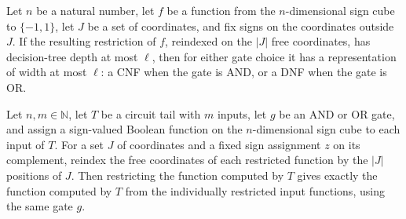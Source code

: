 \begin{theorem}
\label{FABL.CircuitGate.hasWidthLE_reindexedSignRestriction_of_depth_le}
\leanok
{}
Let $n$ be a natural number, let $f$ be a function from the $n$-dimensional sign cube to
$\{−1,1\}$, let $J$ be a set of coordinates, and fix signs on the coordinates outside
$J$. If the resulting restriction of $f$, reindexed on the $|J|$ free coordinates, has
decision-tree depth at most $\ell$, then for either gate choice it has a representation
of width at most $\ell$: a CNF when the gate is AND, or a DNF when the gate is OR.
\end{theorem}

\begin{theorem}
\label{FABL.CircuitTail.reindexedSignRestriction_evalFunction}
\leanok
{}
Let $n,m\in\mathbb{N}$, let $T$ be a circuit tail with $m$ inputs, let $g$ be an AND or
OR gate, and assign a sign-valued Boolean function on the $n$-dimensional sign cube to
each input of $T$. For a set $J$ of coordinates and a fixed sign assignment $z$ on its
complement, reindex the free coordinates of each restricted function by the $|J|$
positions of $J$. Then restricting the function computed by $T$ gives exactly the
function computed by $T$ from the individually restricted input functions, using the
same gate $g$.
\end{theorem}

